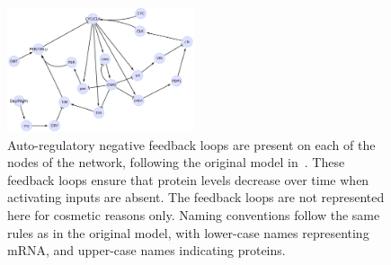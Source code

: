 \documentclass{bmcart}
\begin{document}
\begin{backmatter}
\def\drosophilaGraphScale{0.069}%
\begin{figure}[!htpb]
\begin{center}
\includegraphics[width=0.49\textwidth]{images/drosophila_model5}%
\end{center}
\caption{
Auto-regulatory negative feedback loops are present on each of the nodes of
the network, following the original model in~\cite{drosophila-ode-model}. These feedback loops ensure that
protein levels decrease over time when activating inputs are absent. The feedback loops are not represented here
for cosmetic reasons only.
Naming conventions follow the same rules
as in the original model, with lower-case names representing mRNA, and upper-case names indicating proteins.
}\label{fig:drosophila-model}
\end{figure}



\end{backmatter}
\end{document}
